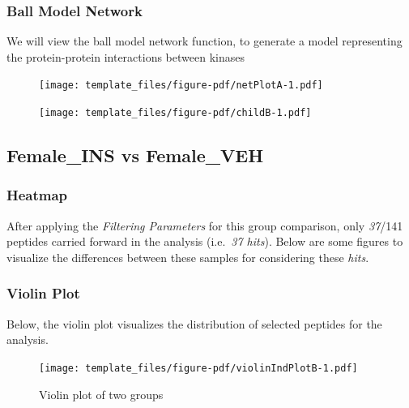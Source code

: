 \documentclass[
  letterpaper,
  DIV=11,
  numbers=noendperiod]{scrreport}
\begin{document}
\hypertarget{ball-model-network}{%
\subsubsection{Ball Model Network}\label{ball-model-network}}

We will view the ball model network function, to generate a model
representing the protein-protein interactions between kinases

\begin{figure}[htbp]

{\centering \texttt{[image: template\_files/figure-pdf/netPlotA-1.pdf]}

}

\end{figure}

\newpage

\begin{figure}[htbp]

{\centering \texttt{[image: template\_files/figure-pdf/childB-1.pdf]}

}

\end{figure}

\hypertarget{female_ins-vs-female_veh}{%
\subsection{Female\_INS vs Female\_VEH}\label{female_ins-vs-female_veh}}

\hypertarget{heatmap-1}{%
\subsubsection{Heatmap}\label{heatmap-1}}

After applying the \emph{Filtering Parameters} for this group
comparison, only \emph{37}/141 peptides carried forward in the analysis
(i.e.~\emph{37 hits}). Below are some figures to visualize the
differences between these samples for considering these \emph{hits}.

\hypertarget{violin-plot-1}{%
\subsubsection{Violin Plot}\label{violin-plot-1}}

Below, the violin plot visualizes the distribution of selected peptides
for the analysis.

\begin{figure}[htbp]

{\centering \texttt{[image: template\_files/figure-pdf/violinIndPlotB-1.pdf]}

}

\caption{Violin plot of two groups}

\end{figure}
\end{document}
